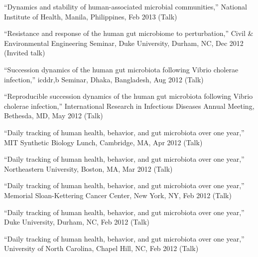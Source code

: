 \documentclass[overlapped,line,11pt]{res}
\begin{document}
\begin{resume}
\begin{revnumerate}[26]
\item {``Dynamics and stability of human-associated microbial
  communities,'' National Institute of Health, Manila,
  Philippines, Feb 2013 (Talk)}
\vspace*{0mm}

\item {``Resistance and response of the human gut microbiome to
  perturbation,'' Civil \& Environmental Engineering Seminar, Duke University,
  Durham, NC, Dec 2012 (Invited talk)}\vspace*{0mm}

\item {``Succession dynamics of the human gut microbiota
  following Vibrio cholerae infection,'' icddr,b Seminar, Dhaka,
  Bangladesh, Aug 2012 (Talk)}
\vspace*{0mm}

\item {``Reproducible succession dynamics of the human gut microbiota
  following Vibrio cholerae infection,'' International Research in
  Infectious Diseases Annual Meeting, Bethesda, MD, May 2012 (Talk)}
\vspace*{0mm}

\item {``Daily tracking of human health, behavior, and gut microbiota
  over one year,'' MIT Synthetic Biology Lunch, Cambridge, MA, Apr 2012 (Talk)}
\vspace*{0mm}

\item {``Daily tracking of human health, behavior, and gut microbiota
  over one year,'' Northeastern University, Boston, MA, Mar 2012 (Talk)}
\vspace*{0mm}

\item {``Daily tracking of human health, behavior, and gut microbiota
  over one year,'' Memorial Sloan-Kettering Cancer Center, New York, NY,
  Feb 2012 (Talk)}
\vspace*{0mm}

\item {``Daily tracking of human health, behavior, and gut microbiota
  over one year,'' Duke University, Durham, NC, Feb 2012 (Talk)}
\vspace*{0mm}

\item {``Daily tracking of human health, behavior, and gut microbiota
  over one year,'' University of North Carolina, Chapel Hill, NC, Feb 2012 (Talk)}
\vspace*{0mm}


\end{revnumerate}
\end{resume}
\end{document}
